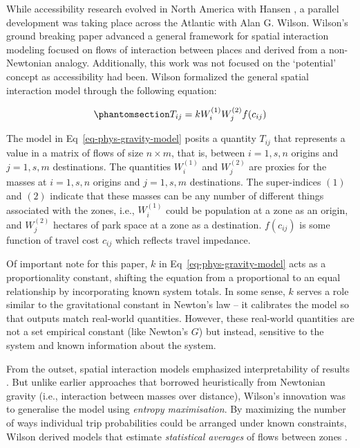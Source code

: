 \documentclass[
  10pt,
  letterpaper,
]{article}
\begin{document}
While accessibility research evolved in North America with Hansen
\citep{hansen1959}, a parallel development was taking place across the
Atlantic with Alan G. Wilson. Wilson's ground breaking paper
\citep{wilson1971} advanced a general framework for spatial interaction
modeling focused on flows of interaction between places and derived from
a non-Newtonian analogy. Additionally, this work was not focused on the
`potential' concept as accessibility had been. Wilson \citep{wilson1971}
formalized the general spatial interaction model through the following
equation:

\begin{equation}\phantomsection\label{eq-phys-gravity-model}{
T_{ij} = k W_i^{(1)} W_j^{(2)} f(c_{ij})
}\end{equation}

The model in Eq~\ref{eq-phys-gravity-model} posits a quantity \(T_{ij}\)
that represents a value in a matrix of flows of size \(n \times m\),
that is, between \(i = 1,s, n\) origins and \(j = 1,s, m\) destinations.
The quantities \(W_i^{(1)}\) and \(W_j^{(2)}\) are proxies for the
masses at \(i=1,s,n\) origins and \(j=1,s,m\) destinations. The
super-indices \((1)\) and \((2)\) indicate that these masses can be any
number of different things associated with the zones, i.e.,
\(W_i^{(1)}\) could be population at a zone as an origin, and
\(W_j^{(2)}\) hectares of park space at a zone as a destination.
\(f(c_{ij})\) is some function of travel cost \(c_{ij}\) which reflects
travel impedance.

Of important note for this paper, \(k\) in
Eq~\ref{eq-phys-gravity-model} acts as a proportionality constant,
shifting the equation from a proportional to an equal relationship by
incorporating known system totals. In some sense, \(k\) serves a role
similar to the gravitational constant in Newton's law -- it calibrates
the model so that outputs match real-world quantities. However, these
real-world quantities are not a set empirical constant (like Newton's
\(G\)) but instead, sensitive to the system and known information about
the system.

From the outset, spatial interaction models emphasized interpretability
of results
\citep{kirbyNormalizingFactorsGravity1970, wilsonSTATISTICALTHEORYSPATIAL1967, wilson1971}.
But unlike earlier approaches that borrowed heuristically from Newtonian
gravity (i.e., interaction between masses over distance), Wilson's
innovation was to generalise the model using \emph{entropy
maximisation}. By maximizing the number of ways individual trip
probabilities could be arranged under known constraints, Wilson derived
models that estimate \emph{statistical averages} of flows between zones
\citep{wilson1971, seniorGravityModellingEntropy1979}.
\end{document}
